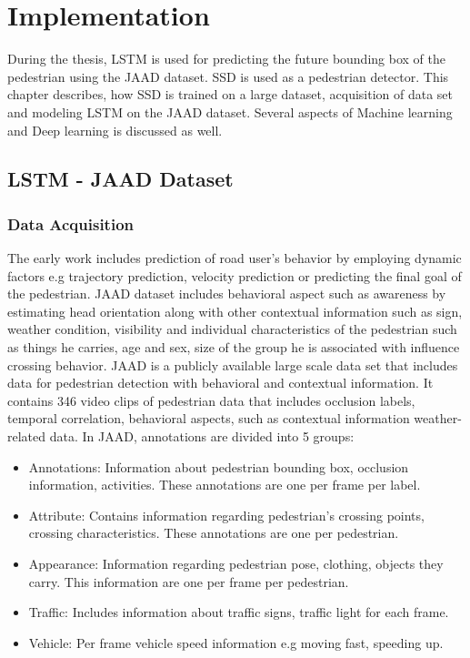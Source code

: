 \chapter{Implementation}
During the thesis, LSTM is used for predicting the future bounding box of the pedestrian using the JAAD dataset. SSD is used as a pedestrian detector. This chapter describes, how SSD is trained on a large dataset, acquisition of data set and modeling LSTM on the JAAD dataset. Several aspects of Machine learning and Deep learning is discussed as well.

\section{LSTM - JAAD Dataset}
\subsection{Data Acquisition}
The early work includes prediction of road user's behavior by employing dynamic factors e.g trajectory prediction, velocity prediction or predicting the final goal of the pedestrian. JAAD dataset includes  behavioral aspect such as awareness by estimating head orientation along with other contextual information such as sign, weather condition, visibility and individual characteristics of the pedestrian such as things he carries, age and sex, size of the group he is associated with influence crossing behavior. JAAD is a publicly available large scale data set that includes data for pedestrian detection with behavioral and contextual information. It contains 346 video clips of pedestrian data that includes occlusion labels, temporal correlation, behavioral aspects, such as contextual information weather-related data.
In JAAD, annotations are divided into 5 groups:
\begin{itemize}
	\item Annotations: Information about pedestrian bounding box, occlusion information, activities. These annotations are one per frame per label.
	\item Attribute: Contains information regarding pedestrian's crossing points, crossing characteristics. These annotations are one per pedestrian.
	\item Appearance: Information regarding pedestrian pose, clothing, objects they carry. This information are one per frame per pedestrian.
	\item Traffic: Includes information about traffic signs, traffic light for each frame.
	\item Vehicle: Per frame vehicle speed information e.g moving fast, speeding up.
\end{itemize}

